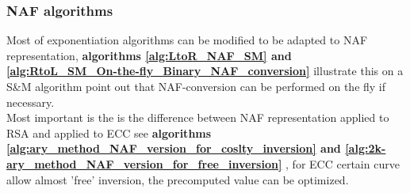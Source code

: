 \newpage
\subsubsection{NAF algorithms}
\label{expNAFalgorithms}

Most of exponentiation algorithms can be modified to be adapted to NAF representation,  
\textbf{algorithms \ref{alg:LtoR_NAF_SM} and 
\ref{alg:RtoL_SM_On-the-fly_Binary_NAF_conversion} } illustrate this on a S\&M algorithm 
point out that NAF-conversion can be performed on the fly if necessary.\\

Most important is the is the difference between NAF representation applied to RSA
and applied to ECC
see \textbf{algorithms \ref{alg:ary_method_NAF_version_for_coslty_inversion} 
and \ref{alg:2k-ary_method_NAF_version_for_free_inversion} }, 
for ECC certain curve allow almost 'free' inversion, 
the precomputed value can be optimized.

